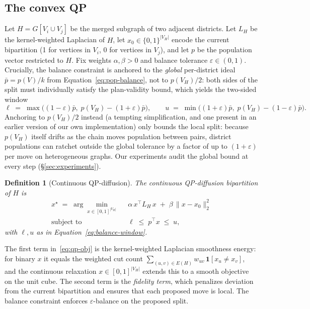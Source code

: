 \documentclass[11pt]{article}
\newtheorem{definition}{Definition}[section]
\begin{document}
\subsection{The convex QP}\label{sec:qp-model}

Let $H = G[V_i \cup V_j]$ be the merged subgraph of two adjacent
districts. Let $L_H$ be the kernel-weighted Laplacian of $H$, let
$x_0 \in \{0,1\}^{|V_H|}$ encode the current bipartition (1 for
vertices in $V_i$, 0 for vertices in $V_j$), and let $p$ be the
population vector restricted to $H$. Fix weights $\alpha, \beta > 0$
and balance tolerance $\varepsilon \in (0, 1)$. Crucially, the balance
constraint is anchored to the \emph{global} per-district ideal
$\bar p = p(V)/k$ from Equation~\eqref{eq:pop-balance}, not to
$p(V_H)/2$: both sides of the split must individually satisfy the
plan-validity bound, which yields the two-sided window
\begin{equation}\label{eq:balance-window}
  \ell \;=\; \max\bigl((1-\varepsilon)\bar p,\; p(V_H) - (1+\varepsilon)\bar p\bigr),
  \qquad
  u \;=\; \min\bigl((1+\varepsilon)\bar p,\; p(V_H) - (1-\varepsilon)\bar p\bigr).
\end{equation}
Anchoring to $p(V_H)/2$ instead (a tempting simplification, and one
present in an earlier version of our own implementation) only bounds
the local split: because $p(V_H)$ itself drifts as the chain moves
population between pairs, district populations can ratchet outside the
global tolerance by a factor of up to $(1+\varepsilon)$ per move on
heterogeneous graphs. Our experiments audit the global bound at every
step (\S\ref{sec:experiments}).

\begin{definition}[Continuous QP-diffusion]\label{def:qp}
The continuous QP-diffusion bipartition of $H$ is
\begin{align}
  x^\star \;=\; \arg\min_{x \in [0,1]^{|V_H|}} \;\;
    & \alpha\, x^\top L_H\, x \;+\; \beta\, \|x - x_0\|_2^2 \label{eq:qp-obj} \\
  \text{subject to} \;\;
    & \ell \;\le\; p^\top x \;\le\; u,
    \label{eq:qp-balance}
\end{align}
with $\ell, u$ as in Equation~\eqref{eq:balance-window}.
\end{definition}

The first term in~\eqref{eq:qp-obj} is the kernel-weighted Laplacian
smoothness energy: for binary $x$ it equals the weighted cut count
$\sum_{(u,v) \in E(H)} w_{uv}\,\mathbf{1}[x_u \ne x_v]$, and the
continuous relaxation $x \in [0,1]^{|V_H|}$ extends this to a smooth
objective on the unit cube. The second term is the \emph{fidelity term},
which penalizes deviation from the current bipartition and ensures
that each proposed move is local. The balance constraint enforces
$\varepsilon$-balance on the proposed split.
\end{document}
